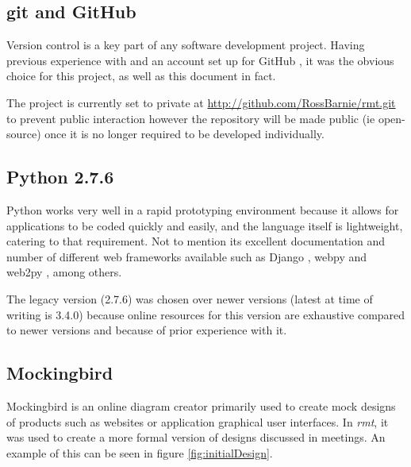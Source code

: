 \subsection{git and GitHub}
Version control is a key part of any software development project.
Having previous experience with and an account set up for GitHub \citeyearpar{github}, it was the obvious choice for this project, as well as this document in fact.

The project is currently set to private at \url{http://github.com/RossBarnie/rmt.git} to prevent public interaction however the repository will be made public (ie open-source) once it is no longer required to be developed individually.

\subsection{Python 2.7.6}
Python works very well in a rapid prototyping environment because it allows for applications to be coded quickly and easily, and the language itself is lightweight, catering to that requirement.
Not to mention its excellent documentation and number of different web frameworks available such as Django \citep{django}, webpy \citep{webpy} and web2py \citeyearpar{web2py}, among others.

The legacy version (2.7.6) was chosen over newer versions (latest at time of writing is 3.4.0) because online resources for this version are exhaustive compared to newer versions and because of prior experience with it.

\subsection{Mockingbird}
Mockingbird \citep{mockingbird} is an online diagram creator primarily used to create mock designs of products such as websites or application graphical user interfaces.
In \emph{rmt}, it was used to create a more formal version of designs discussed in meetings.
An example of this can be seen in figure \ref{fig:initialDesign}.

